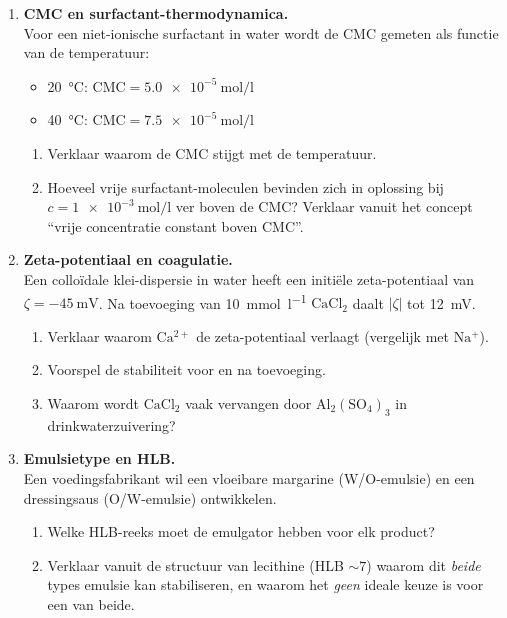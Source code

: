 \begin{enumerate}
\item \textbf{CMC en surfactant-thermodynamica.} \\
Voor een niet-ionische surfactant in water wordt de CMC gemeten als functie van de temperatuur:
\begin{itemize}
\item \SI{20}{\celsius}: $\mathrm{CMC} = \SI{5.0e-5}{\mole\per\litre}$
\item \SI{40}{\celsius}: $\mathrm{CMC} = \SI{7.5e-5}{\mole\per\litre}$
\end{itemize}
\begin{enumerate}
\item[(a)] Verklaar waarom de CMC stijgt met de temperatuur.
\item[(b)] Hoeveel vrije surfactant-moleculen bevinden zich in oplossing bij $c = \SI{1e-3}{\mole\per\litre}$ ver boven de CMC? Verklaar vanuit het concept ``vrije concentratie constant boven CMC''.
\end{enumerate}

\item \textbf{Zeta-potentiaal en coagulatie.} \\
Een collo\"idale klei-dispersie in water heeft een initi\"ele zeta-potentiaal van $\zeta = \SI{-45}{\milli\volt}$. Na toevoeging van \SI{10}{\milli\mole\per\litre} $\mathrm{CaCl_2}$ daalt $|\zeta|$ tot \SI{12}{\milli\volt}.
\begin{enumerate}
\item[(a)] Verklaar waarom $\mathrm{Ca^{2+}}$ de zeta-potentiaal verlaagt (vergelijk met $\mathrm{Na^+}$).
\item[(b)] Voorspel de stabiliteit voor en na toevoeging.
\item[(c)] Waarom wordt $\mathrm{CaCl_2}$ vaak vervangen door $\mathrm{Al_2(SO_4)_3}$ in drinkwaterzuivering?
\end{enumerate}

\item \textbf{Emulsietype en HLB.} \\
Een voedingsfabrikant wil een vloeibare margarine (W/O-emulsie) en een dressingsaus (O/W-emulsie) ontwikkelen.
\begin{enumerate}
\item[(a)] Welke HLB-reeks moet de emulgator hebben voor elk product?
\item[(b)] Verklaar vanuit de structuur van lecithine (HLB $\sim 7$) waarom dit \emph{beide} types emulsie kan stabiliseren, en waarom het \emph{geen} ideale keuze is voor een van beide.
\end{enumerate}

\end{enumerate}

